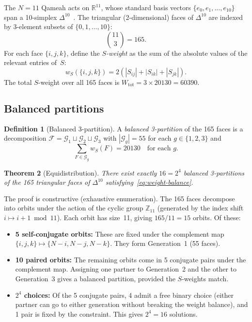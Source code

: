 \documentclass[aip,jmp,reprint,superscriptaddress,floatfix,nofootinbib]{revtex4-2}
\newtheorem{theorem}{Theorem}
\theoremstyle{definition}
\newtheorem{definition}[theorem]{Definition}
\theoremstyle{remark}
\begin{document}
The $N{=}11$ Qameah acts on $\mathbb{R}^{11}$, whose standard
basis vectors $\{e_0, e_1, \ldots, e_{10}\}$ span a 10-simplex
$\Delta^{10}$~\cite{coxeter}.  The triangular (2-dimensional) faces of $\Delta^{10}$
are indexed by 3-element subsets of $\{0,1,\ldots,10\}$:
\begin{equation}\label{eq:face-count}
  \binom{11}{3} = 165.
\end{equation}
For each face $\{i,j,k\}$, define the \emph{$S$-weight} as the
sum of the absolute values of the relevant entries of~$S$:
\begin{equation}\label{eq:s-weight}
  w_S(\{i,j,k\}) = 2(|S_{ij}| + |S_{ik}| + |S_{jk}|).
\end{equation}
The total $S$-weight over all 165 faces is
$W_{\mathrm{tot}} = 3 \times 20130 = 60390$.

\subsection{Balanced partitions}

\begin{definition}[Balanced 3-partition]
A \emph{balanced 3-partition} of the 165 faces is a decomposition
$\mathcal{F} = \mathcal{G}_1 \sqcup \mathcal{G}_2 \sqcup \mathcal{G}_3$
with $|\mathcal{G}_g| = 55$ for each $g \in \{1,2,3\}$ and
\begin{equation}\label{eq:weight-balance}
  \sum_{F \in \mathcal{G}_g} w_S(F) = 20130 \quad
  \text{for each } g.
\end{equation}
\end{definition}

\begin{theorem}[Equidistribution]
\label{thm:three-gen}
There exist exactly $16 = 2^4$ balanced 3-partitions of the 165
triangular faces of $\Delta^{10}$ satisfying~\eqref{eq:weight-balance}.
\end{theorem}

The proof is constructive (exhaustive enumeration).  The 165 faces
decompose into orbits under the action of the cyclic group
$\mathbb{Z}_{11}$ (generated by the index shift $i \mapsto i+1 \bmod 11$).
Each orbit has size~11, giving $165/11 = 15$ orbits.  Of these:

\begin{itemize}
\item \textbf{5 self-conjugate orbits:} These are fixed under the
      complement map $\{i,j,k\} \mapsto \{N{-}i, N{-}j, N{-}k\}$.
      They form Generation~1 (55 faces).

\item \textbf{10 paired orbits:} The remaining orbits come in 5
      conjugate pairs under the complement map.  Assigning one partner
      to Generation~2 and the other to Generation~3 gives a balanced
      partition, provided the $S$-weights match.

\item \textbf{$2^4$ choices:} Of the 5 conjugate pairs, 4 admit a
      free binary choice (either partner can go to either generation
      without breaking the weight balance), and 1 pair is fixed by
      the constraint.  This gives $2^4 = 16$ solutions.
\end{itemize}
\end{document}
